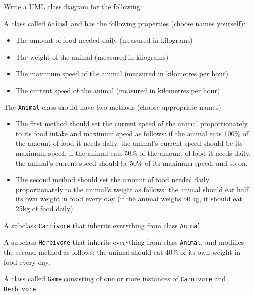 Write a UML class diagram for the following:

A class called \texttt{Animal} and has the following properties (choose names yourself): 
\begin{itemize}
\item The amount of food needed daily (measured in kilograms)
\item The weight of the animal (measured in kilograms)
\item The maximum speed of the animal (measured in kilometres per hour)
\item The current speed of the animal (measured in kilometres per hour)
\end{itemize}
The \texttt{Animal} class should have two methods (choose appropriate names):
\begin{itemize}
\item The first method should set the current speed of the animal proportionately to its food intake and maximum speed as follows: if the animal eats 100\% of the amount of food it needs daily, the animal's current speed should be its maximum speed; if the animal eats 50\% of the amount of food it needs daily, the animal's current speed should be 50\% of its maximum speed, and so on.
\item The second method should set the amount of food needed daily proportionately to the animal's weight as follows: the animal should eat half its own weight in food every day (if the animal weighs 50 kg, it should eat 25kg of food daily).
\end{itemize}

A subclass \texttt{Carnivore} that inherits everything from class \texttt{Animal}.

A subclass \texttt{Herbivore} that inherits everything from class \texttt{Animal}, and modifies the second method as follows: the animal should eat 40\% of its own weight in food every day.

A class called \texttt{Game} consisting of one or more instances of \texttt{Carnivore} and \texttt{Herbivore}.